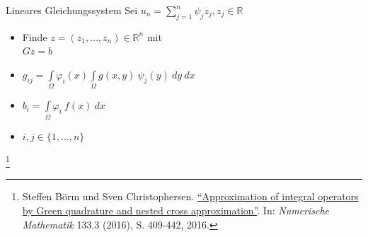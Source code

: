 \documentclass[10pt]{beamer}
\let\svthefootnote\thefootnote
\begin{document}
\begin{frame}{Lineares Gleichungssystem}
  Sei \(u_{n}  = \sum\limits_{j = 1}^{n} \psi_{j} z_{j}, z_{j} \in
        \mathbb{R} \)
  \begin{itemize}
    \item Finde \(z = (z_{1}, \hdots, z_{n}) \in \mathbb{R}^{n}\) mit\\
          \(Gz = b\)
    \item \(g_{ij} = \int\limits_{\Omega} \varphi_{i}(x) \int\limits_{\Omega}
            g(x, y) \ \psi_{j}(y) \ dy \ dx\)
    \item \(b_{i} = \int\limits_{\Omega} \varphi_{i} \ f(x) \ dx\)
    \item \(i, j \in \{ 1, \hdots, n \}\)
  \end{itemize}
  \footnotesize
  \let\thefootnote\relax\footnote{Steffen Börm und Sven Christophersen.
  \href{https://link.springer.com/article/10.1007\%2Fs00211-015-0757-y}{
  ``Approximation of integral operators by Green quadrature and nested cross 
  approximation''}. In:   \textit{Numerische Mathematik} 133.3 (2016), S. 
  409-442, 2016.}
  \addtocounter{footnote}{-1}\let\thefootnote\svthefootnote\relax
  \normalsize
\end{frame}
\end{document}
